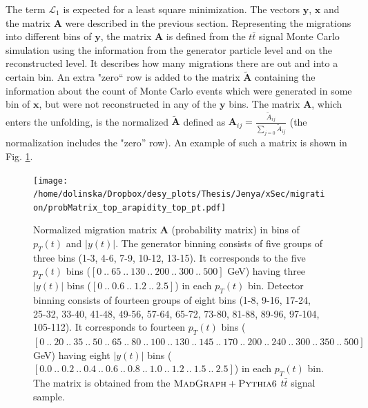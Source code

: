 The term $\mathcal{L}_{1}$ is expected for a least square minimization. The vectors $\mathbf{y}$, $\mathbf{x}$ and the matrix $\mathbf{A}$ were
described in the previous section. Representing the migrations into different bins of $\mathbf{y}$, the matrix $\mathbf{A}$
is defined from the $t\bar{t}$ signal Monte Carlo simulation using the information from the generator particle level and on the reconstructed level. 
It describes how many migrations there are out and into a certain bin. An extra "zero`` row is added to the matrix $\mathbf{\tilde{A}}$ containing 
the information about the count of Monte Carlo events which were generated in some bin of $\mathbf{x}$, but were not reconstructed in any of the
$\mathbf{y}$ bins. The matrix $\mathbf{A}$, which enters the unfolding, is the normalized $\mathbf{\tilde{A}}$ defined as 
$\mathbf{A}_{ij} = \frac{\tilde{A}_{ij}}{\sum_{j=0}\tilde{A}_{ij}}$ (the normalization includes the "zero'' row). An example of such a matrix 
is shown in Fig. \ref{fig:migMat}. 

\begin{figure}[p]
  \centering
  \texttt{[image: /home/dolinska/Dropbox/desy\_plots/Thesis/Jenya/xSec/migration/probMatrix\_top\_arapidity\_top\_pt.pdf]}
  \caption{Normalized migration matrix $\mathbf{A}$ (probability matrix) in bins of $p_{T}(t)$ and $|y(t)|$. The generator binning consists of
          five groups of three bins (1-3, 4-6, 7-9, 10-12, 13-15). It corresponds to the five $p_{T}(t)$ bins ($[0\:..\:65\:..\:130\:..\:200\:..\:300\:..\:500]$ GeV)
          having three $|y(t)|$ bins ($[0\:..\:0.6\:..\:1.2\:..\:2.5]$) in each $p_{T}(t)$ bin.
          Detector binning consists of
          fourteen groups of eight bins (1-8, 9-16, 17-24, 25-32, 33-40, 41-48, 49-56, 57-64, 65-72, 73-80, 81-88, 89-96, 97-104, 105-112). It corresponds 
          to fourteen $p_{T}(t)$ bins ($[0\:..\:20\:..\:35\:..\:50\:..\:65\:..\:80\:..\:100\:..\:130\:..\:145\:..\:170\:..\:200\:..\:240\:..\:300\:..\:350\:..\:500]$ GeV)
          having eight $|y(t)|$ bins ($[0.0\:..\:0.2\:..\:0.4\:..\:0.6\:..\:0.8\:..\:1.0\:..\:1.2\:..\:1.5\:..\:2.5]$) in each $p_{T}(t)$ bin.
          The matrix is obtained from the $\textsc{MadGraph}+\textsc{Pythia}6$ $t\bar{t}$ signal sample.}
  \label{fig:migMat}
\end{figure}

